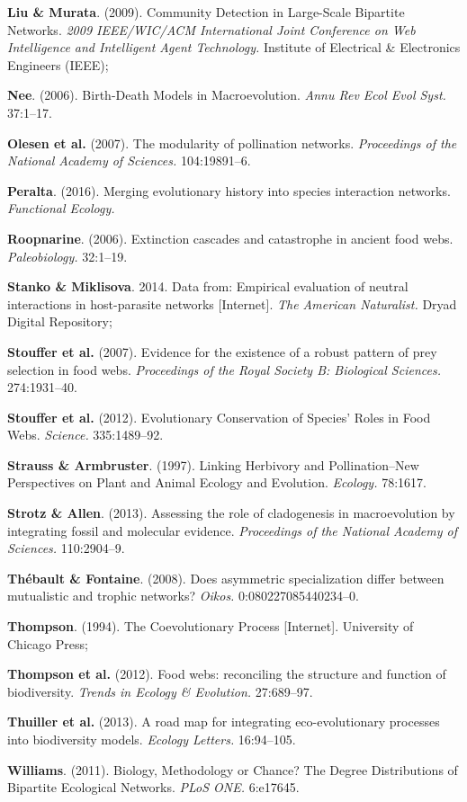 \documentclass[12pt]{article}
\begin{document}
\hypertarget{ref-liu09cdl}{}
\textbf{Liu \& Murata}. (2009). Community Detection in Large-Scale
Bipartite Networks. \emph{2009 IEEE/WIC/ACM International Joint
Conference on Web Intelligence and Intelligent Agent Technology.}
Institute of Electrical \& Electronics Engineers (IEEE);

\hypertarget{ref-nee06bmm}{}
\textbf{Nee}. (2006). Birth-Death Models in Macroevolution. \emph{Annu
Rev Ecol Evol Syst.} 37:1--17.

\hypertarget{ref-oles07mpn}{}
\textbf{Olesen et al.} (2007). The modularity of pollination networks.
\emph{Proceedings of the National Academy of Sciences.} 104:19891--6.

\hypertarget{ref-pera16meh}{}
\textbf{Peralta}. (2016). Merging evolutionary history into species
interaction networks. \emph{Functional Ecology.}

\hypertarget{ref-roop06ecc}{}
\textbf{Roopnarine}. (2006). Extinction cascades and catastrophe in
ancient food webs. \emph{Paleobiology.} 32:1--19.

\hypertarget{ref-stan14dee}{}
\textbf{Stanko \& Miklisova}. 2014. Data from: Empirical evaluation of
neutral interactions in host-parasite networks {[}Internet{]}. \emph{The
American Naturalist.} Dryad Digital Repository;

\hypertarget{ref-stou07eer}{}
\textbf{Stouffer et al.} (2007). Evidence for the existence of a robust
pattern of prey selection in food webs. \emph{Proceedings of the Royal
Society B: Biological Sciences.} 274:1931--40.

\hypertarget{ref-stou12ecs}{}
\textbf{Stouffer et al.} (2012). Evolutionary Conservation of Species'
Roles in Food Webs. \emph{Science.} 335:1489--92.

\hypertarget{ref-stra97lhp}{}
\textbf{Strauss \& Armbruster}. (1997). Linking Herbivory and
Pollination--New Perspectives on Plant and Animal Ecology and Evolution.
\emph{Ecology.} 78:1617.

\hypertarget{ref-stro13arc}{}
\textbf{Strotz \& Allen}. (2013). Assessing the role of cladogenesis in
macroevolution by integrating fossil and molecular evidence.
\emph{Proceedings of the National Academy of Sciences.} 110:2904--9.

\hypertarget{ref-theb08asd}{}
\textbf{Thébault \& Fontaine}. (2008). Does asymmetric specialization
differ between mutualistic and trophic networks? \emph{Oikos.}
0:080227085440234--0.

\hypertarget{ref-thom94cp}{}
\textbf{Thompson}. (1994). The Coevolutionary Process {[}Internet{]}.
University of Chicago Press;

\hypertarget{ref-thom12fwr}{}
\textbf{Thompson et al.} (2012). Food webs: reconciling the structure
and function of biodiversity. \emph{Trends in Ecology \& Evolution.}
27:689--97.

\hypertarget{ref-thui13rmi}{}
\textbf{Thuiller et al.} (2013). A road map for integrating
eco-evolutionary processes into biodiversity models. \emph{Ecology
Letters.} 16:94--105.

\hypertarget{ref-will11bmc}{}
\textbf{Williams}. (2011). Biology, Methodology or Chance? The Degree
Distributions of Bipartite Ecological Networks. \emph{PLoS ONE.}
6:e17645.
\end{document}
